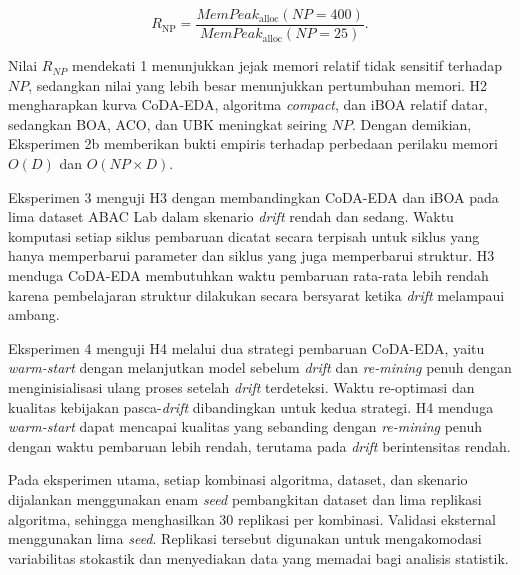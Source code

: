 \begin{equation}
R_{\mathrm{NP}}
=
\frac{
\textit{MemPeak}_{\mathrm{alloc}}(NP=400)
}{
\textit{MemPeak}_{\mathrm{alloc}}(NP=25)
}.
\label{eq:rasio-memori-np}
\end{equation}
\label{first:mempeakalloc}

Nilai $R_{NP}$ mendekati 1 menunjukkan jejak memori relatif tidak sensitif terhadap $NP$, sedangkan nilai yang lebih besar menunjukkan pertumbuhan memori. 
H2 mengharapkan kurva CoDA-EDA, algoritma \textit{compact}, dan iBOA relatif datar, sedangkan BOA, ACO, dan UBK meningkat seiring $NP$. 
Dengan demikian, Eksperimen 2b memberikan bukti empiris terhadap perbedaan perilaku memori $O(D)$ dan $O(NP\times D)$.

Eksperimen 3 menguji H3 dengan membandingkan CoDA-EDA dan iBOA pada lima dataset ABAC Lab dalam skenario \textit{drift} rendah dan sedang. 
Waktu komputasi setiap siklus pembaruan dicatat secara terpisah untuk siklus yang hanya memperbarui parameter dan siklus yang juga memperbarui struktur. 
H3 menduga CoDA-EDA membutuhkan waktu pembaruan rata-rata lebih rendah karena pembelajaran struktur dilakukan secara bersyarat ketika \textit{drift} melampaui ambang.

Eksperimen 4 menguji H4 melalui dua strategi pembaruan CoDA-EDA, yaitu \textit{warm-start} dengan melanjutkan model sebelum \textit{drift} dan \textit{re-mining} penuh dengan menginisialisasi ulang proses setelah \textit{drift} terdeteksi. 
Waktu re-optimasi dan kualitas kebijakan pasca-\textit{drift} dibandingkan untuk kedua strategi. 
H4 menduga \textit{warm-start} dapat mencapai kualitas yang sebanding dengan \textit{re-mining} penuh dengan waktu pembaruan lebih rendah, terutama pada \textit{drift} berintensitas rendah.

Pada eksperimen utama, setiap kombinasi algoritma, dataset, dan skenario dijalankan menggunakan enam \textit{seed} pembangkitan dataset dan lima replikasi algoritma, sehingga menghasilkan 30 replikasi per kombinasi. 
Validasi eksternal menggunakan lima \textit{seed}. 
Replikasi tersebut digunakan untuk mengakomodasi variabilitas stokastik dan menyediakan data yang memadai bagi analisis statistik.

